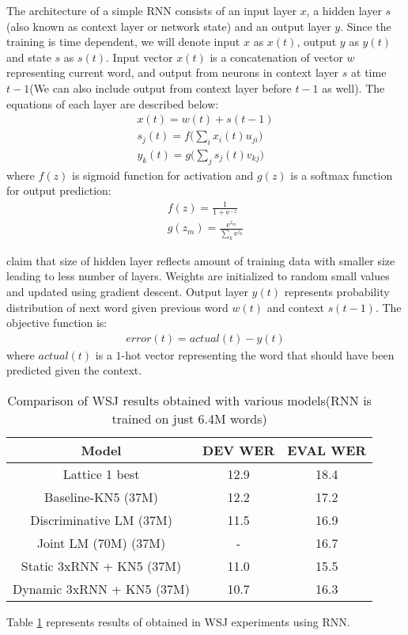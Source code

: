 The architecture of a simple RNN consists of an input layer $x$, a hidden layer $s$(also known as context layer or network state) and an output layer $y$. Since the training is time dependent, we will denote input $x$ as $x(t)$, output $y$ as $y(t)$ and state $s$ as $s(t)$. Input vector $x(t)$ is a concatenation of vector $w$ representing current word, and output from neurons in context layer $s$ at time $t-1$(We can also include output from context layer before $t-1$ as well). The equations of each layer are described below:
\begin{align}
x(t) = w(t) + s(t-1) \\
s_j(t) = f\bigg(\sum_{i}x_i(t)u_{ji}\bigg) \\
y_k(t) = g\bigg(\sum_{j}s_j(t)v_{kj}\bigg)
\end{align}
where $f(z)$ is sigmoid function for activation and $g(z)$ is a softmax function for output prediction:
\begin{align}
f(z) = \frac{1}{1+\mathrm{e}^{-z}} \\
g(z_m) = \frac{\mathrm{e}^{z_m}}{\sum_{k}\mathrm{e}^{z_k}}
\end{align}

\cite{Mikolov:10} claim that size of hidden layer reflects amount of training data with smaller size leading to less number of layers. Weights are initialized to random small values and updated using gradient descent. Output layer $y(t)$ represents probability distribution of next word given previous word $w(t)$ and context $s(t-1)$. The objective function is:
\begin{align}
error(t) =  actual(t) - y(t)
\end{align}
where $actual(t)$ is a $1$-hot vector representing the word that should have been predicted given the context.
\begin {table}[h!]
\centering
\begin{tabular}{ |c|c|c| }
\hline
Model & DEV WER & EVAL WER \\ \hline
Lattice 1 best & 12.9 & 18.4 \\ 
Baseline-KN5 (37M) & 12.2 & 17.2 \\
Discriminative LM (37M) & 11.5 & 16.9 \\
Joint LM (70M) (37M) & - & 16.7 \\ \hline
Static 3xRNN + KN5 (37M) & 11.0 & 15.5 \\
Dynamic 3xRNN + KN5 (37M) & 10.7 & 16.3 \\
\hline
\end{tabular}
\caption {Comparison of WSJ results obtained with various models(RNN is trained on just 6.4M words)}
\label{table:rnn}
\end{table}
Table \ref{table:rnn} represents results of \cite{Mikolov:10} obtained in WSJ experiments using RNN.\\

